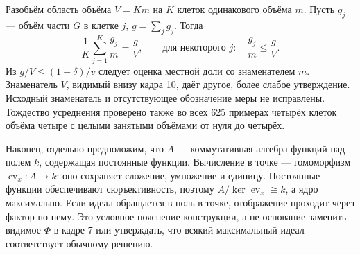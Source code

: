 \documentclass[11pt]{article}
\begin{document}
Разобьём область объёма \(V=Km\) на \(K\) клеток одинакового объёма \(m\). Пусть \(g_j\) — объём части \(G\) в клетке \(j\), \(g=\sum_jg_j\). Тогда
\[\frac1K\sum_{j=1}^K\frac{g_j}{m}=\frac gV,\qquad
 \text{для некоторого }j:\quad\frac{g_j}{m}\le\frac gV.\]
Из \(g/V\le(1-\delta)/v\) следует оценка местной доли со знаменателем \(m\). Знаменатель \(V\), видимый внизу кадра 10, даёт другое, более слабое утверждение. Исходный знаменатель и отсутствующее обозначение меры не исправлены. Тождество усреднения проверено также во всех 625 примерах четырёх клеток объёма четыре с целыми занятыми объёмами от нуля до четырёх.

Наконец, отдельно предположим, что \(A\) — коммутативная алгебра функций над полем \(k\), содержащая постоянные функции. Вычисление в точке — гомоморфизм \(\operatorname{ev}_x:A\to k\): оно сохраняет сложение, умножение и единицу. Постоянные функции обеспечивают сюръективность, поэтому \(A/\ker\operatorname{ev}_x\cong k\), а ядро максимально. Если идеал обращается в ноль в точке, отображение проходит через фактор по нему. Это условное пояснение конструкции, а не основание заменить видимое \(\Phi\) в кадре 7 или утверждать, что всякий максимальный идеал соответствует обычному решению.
\end{document}

